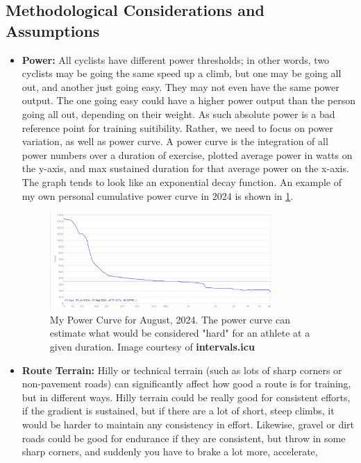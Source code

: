 \documentclass[11pt,twoside]{report}
\begin{document}
\subsection{Methodological Considerations and Assumptions}
\begin{itemize}
	\item \textbf{Power:} All cyclists have different power thresholds; in other words, two cyclists may be going the same speed up a climb, but one may be going all out, and another just going easy.
	      They may not even have the same power output. The one going easy could have a higher power output than the person going all out, depending on their weight. As such absolute power is a bad reference
	      point for training suitibility. Rather, we need to focus on power variation, as well as power curve. A power curve is the integration of all power numbers over a duration of exercise, plotted average power in watts on the y-axis,
	      and max sustained duration for that average power on the x-axis. The graph tends to look like an exponential decay function. An example of my own personal cumulative power curve in 2024 is shown in \ref{fig:jibb_powercurve}.
	      \begin{figure}[htbp!]
		      \centering
		      \includegraphics[width=0.8\textwidth]{jibb_powercurve.png}
		      \caption{My Power Curve for August, 2024. The power curve can estimate what would be considered "hard" for an athlete at a given duration. Image courtesy of \textbf{intervals.icu}}
		      \label{fig:jibb_powercurve}
	      \end{figure}
	\item \textbf{Route Terrain:} Hilly or technical terrain (such as lots of sharp corners or non-pavement roads) can significantly affect how good a route is for training, but
	      in different ways. Hilly terrain could be really good for consistent efforts, if the gradient is sustained, but if there are a lot of short, steep climbs, it would be harder to maintain
	      any consistency in effort. Likewise, gravel or dirt roads could be good for endurance if they are consistent, but throw in some sharp corners, and suddenly you have to brake a lot more, accelerate,

\end{itemize}
\end{document}
